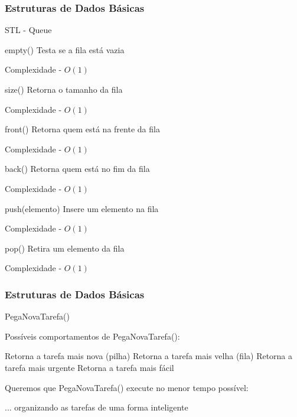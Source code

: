 \begin{frame}
\frametitle{Estruturas de Dados Básicas}
\begin{block}{STL - Queue}
\begin{itemize}
	\bitem empty() Testa se a fila está vazia
	\begin{itemize}
		\bitem Complexidade - $O(1)$
	\end{itemize}
	\bitem size() Retorna o tamanho da fila
	\begin{itemize}
		\bitem Complexidade - $O(1)$
	\end{itemize}
	\bitem front() Retorna quem está na frente da fila
	\begin{itemize}
		\bitem Complexidade - $O(1)$
	\end{itemize}
	\bitem back() Retorna quem está no fim da fila
	\begin{itemize}
		\bitem Complexidade - $O(1)$
	\end{itemize}
	\bitem push(elemento) Insere um elemento na fila
	\begin{itemize}
		\bitem Complexidade - $O(1)$
	\end{itemize}
	\bitem pop() Retira um elemento da fila
	\begin{itemize}
		\bitem Complexidade - $O(1)$
	\end{itemize}
\end{itemize}
\end{block}
\end{frame}

\begin{frame}
\frametitle{Estruturas de Dados Básicas}
\begin{block}{PegaNovaTarefa()}
\begin{itemize}
	\bitem Possíveis comportamentos de PegaNovaTarefa():
	\begin{itemize}
		\bitem Retorna a tarefa mais nova (pilha)
		\bitem Retorna a tarefa mais velha (fila)
		\bitem Retorna a tarefa mais urgente
		\bitem Retorna a tarefa mais fácil
	\end{itemize}
	\bitem Queremos que PegaNovaTarefa() execute no menor tempo possível:
	\begin{itemize}
		\bitem ... organizando as tarefas de uma forma inteligente
	\end{itemize}
\end{itemize}
\end{block}
\end{frame}

